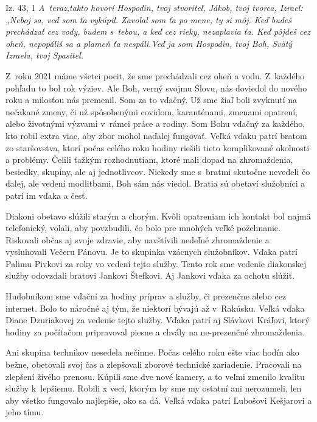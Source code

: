 \def\velkostpisma{10}
\def\velkostriadku{12.5}


Iz. 43, 1 {\it A~teraz,takto hovorí Hospodin, tvoj stvoriteľ, Jákob, tvoj tvorca, Izrael: „Neboj sa, veď som ťa vykúpil. Zavolal som ťa po mene, ty si môj. Keď budeš prechádzať cez vody, budem s~tebou, a keď cez rieky, nezaplavia ťa. Keď pôjdeš cez oheň, nepopáliš sa a plameň ťa nespáli.Veď ja som Hospodin, tvoj Boh, Svätý Izraela, tvoj Spasiteľ.}


Z~roku 2021 máme všetci pocit, že sme prechádzali cez oheň a vodu. Z~každého pohľadu to bol rok výziev. Ale Boh, verný svojmu Slovu, nás doviedol do nového roku a milosťou nás premenil. Som za to vďačný. Už sme žiaľ boli zvyknutí na nečakané zmeny, či už spôsobenými covidom, karanténami, zmenami opatrení, alebo životnými výzvami v~rámci práce a rodiny. Som Bohu vďačný za každého, kto robil extra viac, aby zbor mohol naďalej fungovať.
Veľká vďaku patrí bratom zo staršovstva, ktorí počas celého roku hodiny riešili tieto komplikované okolnosti a problémy. Čelili ťažkým rozhodnutiam, ktoré mali dopad na zhromaždenia, besiedky, skupiny, ale aj jednotlivcov. Niekedy sme s~bratmi skutočne nevedeli čo ďalej, ale vedení modlitbami, Boh sám nás viedol. Bratia sú obetaví služobníci a patrí im vďaka a česť. 

Diakoni obetavo slúžili starým a chorým. Kvôli opatreniam ich kontakt bol najmä telefonický, volali, aby  povzbudili, čo bolo pre mnohých veľké požehnanie. Riskovali občas aj svoje zdravie, aby navštívili nedeľné zhromaždenie a vysluhovali Večeru Pánovu. Je to skupinka vzácnych služobníkov. Vďaka patrí Palimu Pivkovi za roky vo vedení tejto služby. 
Tento rok sme vedenie diakonskej služby odovzdali bratovi Jankovi Štefkovi. Aj Jankovi vďaka za ochotu slúžiť. 

Hudobníkom sme vďační za hodiny príprav a služby, či prezenčne alebo cez internet. Bolo to náročné aj tým, že niektorí bývajú až v~Rakúsku. Veľká vďaka Diane Dzuriakovej za vedenie tejto služby. Vďaka patrí aj Slávkovi Kráľovi, ktorý hodiny za počítačom pripravoval piesne a chvály na ne-prezenčné zhromaždenia.

Ani skupina technikov nesedela nečinne. Počas celého roku ešte viac hodín ako bežne, obetovali svoj čas a zlepšovali zborové technické zariadenie. Pracovali na zlepšení živého prenosu. Kúpili sme dve nové kamery, a to veľmi zmenilo kvalitu služby k~lepšiemu. Robili x vecí, ktorým by sme my ostatní ani nerozumeli, len aby všetko fungovalo najlepšie, ako sa dá. Veľká vďaka patrí Ľubošovi Kešjarovi a jeho tímu. 

